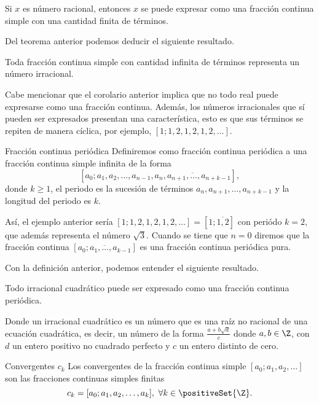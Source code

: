 \begin{theorem.box}{}{}
    Si $x$ es número racional, entonces $x$ se puede expresar como una fracción continua simple con una cantidad finita de términos.
\end{theorem.box}

Del teorema anterior podemos deducir el siguiente resultado.

\begin{corollary}
    Toda fracción continua simple con cantidad infinita de términos representa un número irracional.
\end{corollary}

Cabe mencionar que el corolario anterior implica que no todo real puede expresarse como una fracción continua.
Además, los números irracionales que sí pueden ser expresados presentan una característica, esto es que sus términos
se repiten de manera cíclica, por ejemplo, $[1; 1, 2,1,2,1,2, \ldots]$.

\begin{definition.box}{Fracción continua periódica}{}
    Definiremos como fracción continua periódica a una fracción continua simple infinita de la forma
    \[
        [a_0; a_1, a_2, \ldots, a_{n -1}, \overline{a_n, a_{n + 1},\ldots, a_{n + k - 1}}],
    \]
    donde $k \geq 1$, el periodo es la sucesión de términos $a_{n}, a_{n + 1},\ldots, a_{n + k  - 1}$ y la longitud del periodo es $k$.
\end{definition.box}

Así, el ejemplo anterior sería $[1; 1, 2,1,2,1,2, \ldots] = [1; \overline{1,2}]$ con periódo $k = 2$, que además representa el número $\sqrt {3}$.
Cuando se tiene que $n = 0$ diremos que la fracción continua $[\overline{a_0;a_1, \ldots, a_{k - 1}}]$ es una fracción continua periódica pura.

Con la definición anterior, podemos entender el siguiente resultado.

\begin{theorem.box}{}{}
    Todo irracional cuadrático puede ser expresado como una fracción continua periódica.
\end{theorem.box}

Donde un irracional cuadrático es un número que es una raíz no racional de una ecuación cuadrática, es decir, un número de la forma $\frac{a + b\sqrt {d}}{c}$ donde $a,b \in \Z$, con $d$ un entero positivo no cuadrado perfecto y $c$ un entero distinto de cero.

\begin{definition.box}{Convergentes $c_k$}{}
    Los convergentes de la fracción continua simple $[a_0; a_1, a_2, \ldots]$ son las fracciones continuas simples finitas
    \[
        c_k = [a_0; a_1, a_2, \ldots, a_k],\ \forall k \in \positiveSet{\Z}.
    \]
\end{definition.box}

